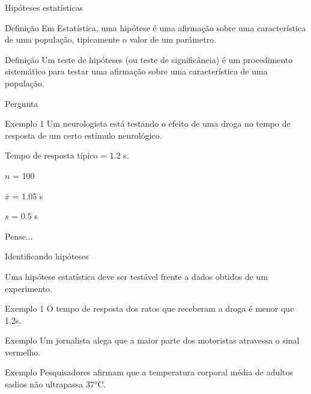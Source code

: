 \documentclass{beamer}
\begin{document}
\begin{frame}{Hipóteses estatísticas}
  \begin{block}{Definição}
    \small
    Em Estatística, uma \alert{hipótese} é uma afirmação sobre uma
    característica de uma população, tipicamente o valor de um
    parâmetro.
  \end{block}
  \begin{block}{Definição}
    \small
    Um \alert{teste de hipóteses} (ou teste de significância) é um
    procedimento sistemático para testar uma afirmação sobre uma
    característica de uma população.
  \end{block}
\end{frame}

\begin{frame}{Pergunta}
  \begin{exampleblock}{Exemplo 1}
    \scriptsize
    Um neurologista está testando o efeito de uma droga no tempo de
    resposta de um certo estímulo neurológico.

    \smallskip
    Tempo de resposta típico = \alert{1.2 s}.

    \smallskip
    $n$ = \alert{100}

    $\bar{x}$ = \alert{1.05 s}

    $s$ = \alert{0.5 s}
  \end{exampleblock}
  \begin{block}{Pense...}

    \bigskip
  \end{block}
\end{frame}

\begin{frame}{Identificando hipóteses}
  \begin{block}{}
    \small
    Uma hipótese estatística deve ser testável frente a dados obtidos de um experimento.
  \end{block}
  \begin{exampleblock}{Exemplo 1}
    \footnotesize
    O tempo de resposta dos ratos que receberam a droga é menor que 1.2s.
  \end{exampleblock}
  \begin{exampleblock}{{\footnotesize Exemplo}}
    \scriptsize
    Um jornalista alega que a maior parte dos motoristas atravessa o
    sinal vermelho.
  \end{exampleblock}
  \begin{exampleblock}{{\footnotesize Exemplo}}
    \scriptsize
    Pesquisadores afirmam que a temperatura corporal média de adultos
    sadios não ultrapassa 37$^o$C.
  \end{exampleblock}
\end{frame}
\end{document}
